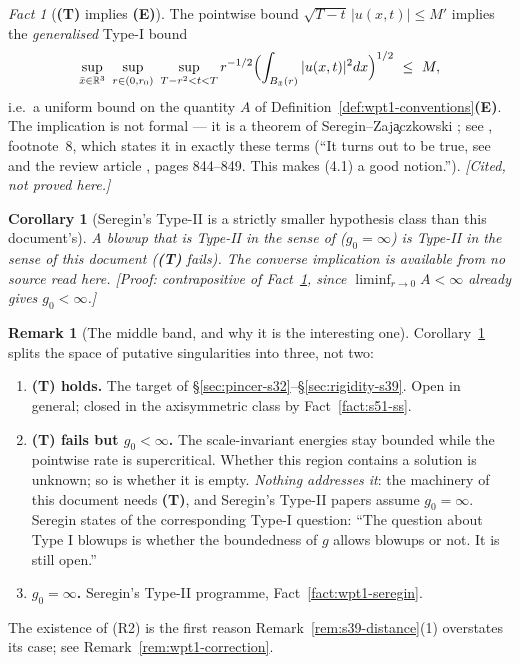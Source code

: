 \documentclass[11pt]{article}
\newtheorem{corollary}[theorem]{Corollary}
\theoremstyle{definition}
\newtheorem{remark}[theorem]{Remark}
\theoremstyle{remark}
\newtheorem{fact}[theorem]{Fact}
\newcommand{\R}{\mathbb{R}}
\begin{document}
\begin{fact}[\textbf{(T)} implies \textbf{(E)}]\label{fact:wpt1-T-implies-E}
  The pointwise bound $\sqrt{T-t}\,|u(x,t)|\leq M'$ implies the
  \emph{generalised} Type-I bound
  \[
    \sup_{\bar x\in\R^3}\ \sup_{r\in(0,r_0)}\ \sup_{T-r^2<t<T}
      r^{-1/2}\Bigl(\int_{B_{\bar x}(r)}|u(x,t)|^2dx\Bigr)^{1/2}\ \leq\ M,
  \]
  i.e.\ a uniform bound on the quantity $A$ of
  Definition~\ref{def:wpt1-conventions}\textbf{(E)}. The implication is not
  formal --- it is a theorem of Seregin--Zaj\c{a}czkowski
  \cite{SereginZajaczkowski2006}; see \cite{BarkerPrange2023}, footnote~8,
  which states it in exactly these terms (``It turns out to be true, see
  \cite{SereginZajaczkowski2006} and the review article
  \cite{SereginSverakHandbook}, pages 844--849. This makes (4.1) a good
  notion.'').
  \emph{[Cited, not proved here.]}
\end{fact}

\begin{corollary}[Seregin's Type-II is a strictly smaller hypothesis class
  than this document's]\label{cor:wpt1-inclusion}
  A blowup that is Type-II in the sense of \cite{Seregin2026Potential}
  ($g_0=\infty$) is Type-II in the sense of this document (\textbf{(T)}
  fails). The converse implication is available from no source read here.
  \emph{[Proof: contrapositive of Fact~\ref{fact:wpt1-T-implies-E}, since
  $\liminf_{r\to0}A<\infty$ already gives $g_0<\infty$.]}
\end{corollary}

\begin{remark}[The middle band, and why it is the interesting one]
  \label{rem:wpt1-middle-band}
  Corollary~\ref{cor:wpt1-inclusion} splits the space of putative
  singularities into three, not two:
  \begin{enumerate}[label=\textup{(R\arabic*)},leftmargin=2.8em]
    \item \textbf{\textbf{(T)} holds.} The target of
      \S\ref{sec:pincer-s32}--\S\ref{sec:rigidity-s39}. Open in general;
      closed in the axisymmetric class by Fact~\ref{fact:s51-ss}.
    \item \textbf{\textbf{(T)} fails but $g_0<\infty$.} The scale-invariant
      energies stay bounded while the pointwise rate is supercritical.
      Whether this region contains a solution is unknown; so is whether it is
      empty. \emph{Nothing addresses it}: the machinery of this document
      needs \textbf{(T)}, and Seregin's Type-II papers assume $g_0=\infty$.
      Seregin \cite{Seregin2024TypeII} states of the corresponding Type-I
      question: ``The question about Type I blowups is whether the
      boundedness of $g$ allows blowups or not. It is still open.''
    \item \textbf{$g_0=\infty$.} Seregin's Type-II programme,
      Fact~\ref{fact:wpt1-seregin}.
  \end{enumerate}
  The existence of (R2) is the first reason
  Remark~\ref{rem:s39-distance}(1) overstates its case; see
  Remark~\ref{rem:wpt1-correction}.
\end{remark}
\end{document}
